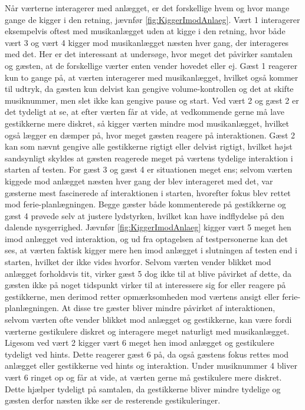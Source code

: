 Når værterne interagerer med anlægget, er det forskellige hvem og hvor mange gange de kigger i den retning, jævnfør \autoref{fig:KiggerImodAnlaeg}. Vært 1 interagerer eksempelvis oftest med musikanlægget uden at kigge i den retning, hvor både vært 3 og vært 4 kigger mod musikanlægget næsten hver gang, der interageres med det. Her er det interessant at undersøge, hvor meget det påvirker samtalen og gæsten, at de forskellige værter enten vender hovedet eller ej. Gæst 1 reagerer kun to gange på, at værten interagerer med musikanlægget, hvilket også kommer til udtryk, da gæsten kun delvist kan gengive volume-kontrollen og det at skifte musiknummer, men slet ikke kan gengive pause og start. Ved vært 2 og gæst 2 er det tydeligt at se, at efter værten får at vide, at vedkommende gerne må lave gestikkerne mere diskret, så kigger værten mindre mod musikanlægget, hvilket også lægger en dæmper på, hvor meget gæsten reagere på interaktionen. Gæst 2 kan som nævnt gengive alle gestikkerne rigtigt eller delvist rigtigt, hvilket højst sandsynligt skyldes at gæsten reagerede meget på værtens tydelige interaktion i starten af testen. For gæst 3 og gæst 4 er situationen meget ens; selvom værten kiggede mod anlægget næsten hver gang der blev interageret med det, var gæsterne mest fascinerede af interaktionen i starten, hvorefter fokus blev rettet mod ferie-planlægningen. Begge gæster både kommenterede på gestikkerne og gæst 4 prøvede selv at justere lydstyrken, hvilket kan have indflydelse på den dalende nysgerrighed. Jævnfør \autoref{fig:KiggerImodAnlaeg} kigger vært 5 meget hen imod anlægget ved interaktion, og ud fra optagelsen af testpersonerne kan det ses, at værten faktisk kigger mere hen imod anlægget i slutningen af testen end i starten, hvilket der ikke vides hvorfor. Selvom værten vender blikket mod anlægget forholdsvis tit, virker gæst 5 dog ikke til at blive påvirket af dette, da gæsten ikke på noget tidspunkt virker til at interessere sig for eller reagere på gestikkerne, men derimod retter opmærksomheden mod værtens ansigt eller ferie-planlægningen. At disse tre gæster bliver mindre påvirket af interaktionen, selvom værten ofte vender blikket mod anlægget og gestikkerne, kan være fordi værterne gestikulere diskret og interagere meget naturligt med musikanlægget. Ligesom ved vært 2 kigger vært 6 meget hen imod anlægget og gestikulere tydeligt ved hints. Dette reagerer gæst 6 på, da også gæstens fokus rettes mod anlægget eller gestikkerne ved hints og interaktion. Under musiknummer 4 bliver vært 6 ringet op og får at vide, at værten gerne må gestikulere mere diskret. Dette hjælper tydeligt på samtalen, da gestikkerne bliver mindre tydelige og gæsten derfor næsten ikke ser de resterende gestikuleringer. 

